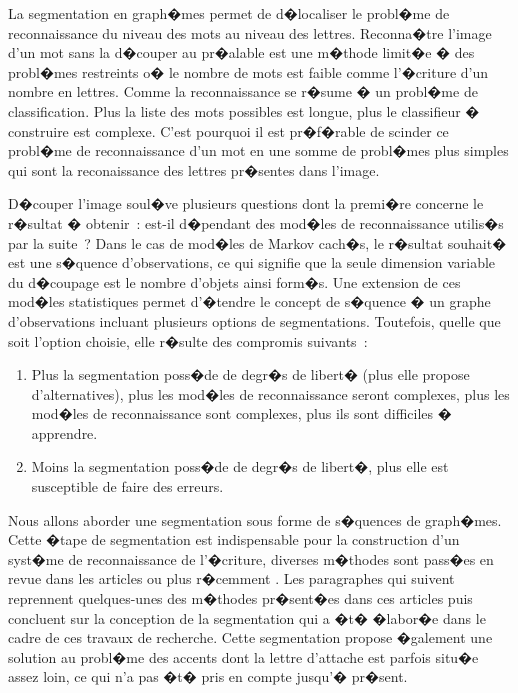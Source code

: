 La segmentation en graph�mes permet de d�localiser le probl�me de reconnaissance du niveau des mots au niveau des lettres. Reconna�tre l'image d'un mot sans la d�couper au pr�alable est une m�thode limit�e � des probl�mes restreints o� le nombre de mots est faible comme l'�criture d'un nombre en lettres. Comme la reconnaissance se r�sume � un probl�me de classification. Plus la liste des mots possibles est longue, plus le classifieur � construire est complexe. C'est pourquoi il est pr�f�rable de scinder ce probl�me de reconnaissance d'un mot en une somme de probl�mes plus simples qui sont la reconaissance des lettres pr�sentes dans l'image. 

D�couper l'image soul�ve plusieurs questions dont la premi�re concerne le r�sultat � obtenir~: est-il d�pendant des mod�les de reconnaissance utilis�s par la suite~? Dans le cas de mod�les de Markov cach�s, le r�sultat souhait� est une s�quence d'observations, ce qui signifie que la seule dimension variable du d�coupage est le nombre d'objets ainsi form�s. Une extension de ces mod�les statistiques permet d'�tendre le concept de s�quence � un graphe d'observations incluant plusieurs options de segmentations. Toutefois, quelle que soit l'option choisie, elle r�sulte des compromis suivants~: 

            \begin{enumerate}
            \item Plus la segmentation poss�de de degr�s de libert� (plus elle propose d'alternatives), 
                        plus les mod�les de reconnaissance seront complexes, plus les mod�les de reconnaissance 
                        sont complexes, plus ils sont difficiles � apprendre.
            \item Moins la segmentation poss�de de degr�s de libert�, plus elle est susceptible de faire des erreurs.
            \end{enumerate}


Nous allons aborder une segmentation sous forme de s�quences de graph�mes. Cette �tape de segmentation est indispensable pour la construction d'un syst�me de reconnaissance de l'�criture, diverses m�thodes sont pass�es en revue dans les articles  ou plus r�cemment . Les paragraphes qui suivent reprennent quelques-unes des m�thodes pr�sent�es dans ces articles puis concluent sur la conception de la segmentation qui a �t� �labor�e dans le cadre de ces travaux de recherche.  Cette segmentation propose �galement une solution au probl�me des accents dont la lettre d'attache est parfois situ�e assez loin, ce qui n'a pas �t� pris en compte jusqu'� pr�sent.
















